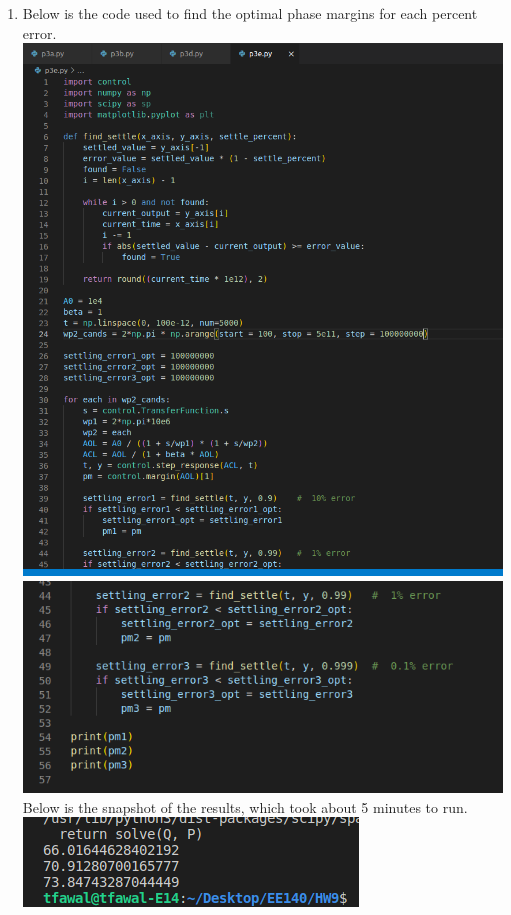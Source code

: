 \documentclass[12pt, fleqn]{article}
\begin{document}
\begin{enumerate}[label=(\alph*)]
{        }
        \newpage
        \item
        {
        Below is the code used to find the optimal phase margins for each percent error.\\[0.25cm]
        \includegraphics[scale=0.45, center]{p3e_code1.PNG}\\[0.25cm]
        \includegraphics[scale=0.45, center]{p3e_code2.PNG}\\[0.25cm]
        Below is the snapshot of the results, which took about 5 minutes to run.\\[0.25cm]
        \includegraphics[scale=0.45, center]{p3e_res.PNG}\\[0.25cm]
}
\end{enumerate}
\end{document}
